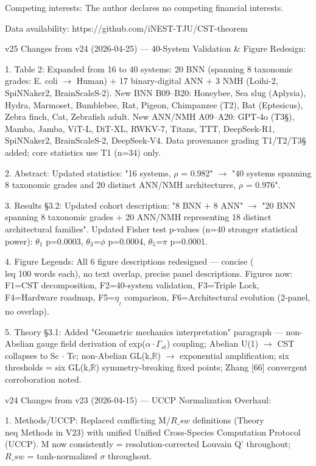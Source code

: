 \documentclass[a4paper,12pt]{article}
\begin{document}
Competing interests: The author declares no competing financial interests.

Data availability: https://github.com/iNEST-TJU/CST-theorem

v25 Changes from v24 (2026-04-25) --- 40-System Validation \& Figure Redesign:

1. Table 2: Expanded from 16 to 40 systems: 20 BNN (spanning 8 taxonomic grades: E. coli $\rightarrow$ Human) + 17 binary-digital ANN + 3 NMH (Loihi-2, SpiNNaker2, BrainScaleS-2). New BNN B09--B20: Honeybee, Sea slug (Aplysia), Hydra, Marmoset, Bumblebee, Rat, Pigeon, Chimpanzee (T2\dag), Bat (Eptesicus), Zebra finch, Cat, Zebrafish adult. New ANN/NMH A09--A20: GPT-4o (T3\S{}), Mamba, Jamba, ViT-L, DiT-XL, RWKV-7, Titans, TTT, DeepSeek-R1, SpiNNaker2, BrainScaleS-2, DeepSeek-V4. Data provenance grading T1/T2\dag/T3\S{} added; core statistics use T1 (n=34) only.

2. Abstract: Updated statistics: "16 systems, $\rho$ = 0.982" $\rightarrow$ "40 systems spanning 8 taxonomic grades and 20 distinct ANN/NMH architectures, $\rho$ = 0.976".

3. Results \S{}3.2: Updated cohort description: "8 BNN + 8 ANN" $\rightarrow$ "20 BNN spanning 8 taxonomic grades + 20 ANN/NMH representing 18 distinct architectural families". Updated Fisher test p-values (n=40 stronger statistical power): $\theta_1$ p=0.0003, $\theta_3$=$\phi$ p=0.0004, $\theta_5$=$\pi$ p=0.0001.

4. Figure Legends: All 6 figure descriptions redesigned --- concise ( \\leq 100 words each), no text overlap, precise panel descriptions. Figures now: F1=CST decomposition, F2=40-system validation, F3=Triple Lock, F4=Hardware roadmap, F5=$\eta_{_I}$ comparison, F6=Architectural evolution (2-panel, no overlap).

5. Theory \S{}3.1: Added "Geometric mechanics interpretation" paragraph --- non-Abelian gauge field derivation of exp($\alpha \cdot \Gamma_{st}$) coupling; Abelian U(1) $\rightarrow$ CST collapses to Sc $\cdot$ Tc; non-Abelian GL(k,$\mathbb{R}$) $\rightarrow$ exponential amplification; six thresholds = six GL(k,$\mathbb{R}$) symmetry-breaking fixed points; Zhang [66] convergent corroboration noted.

v24 Changes from v23 (2026-04-15) --- UCCP Normalization Overhaul:

1. Methods/UCCP: Replaced conflicting M/$R\_{sw}$ definitions (Theory  \\neq  Methods in V23) with unified Unified Cross-Species Computation Protocol (UCCP). M now consistently = resolution-corrected Louvain Q' throughout; $R\_{sw}$ = tanh-normalized $\sigma$ throughout.
\end{document}
